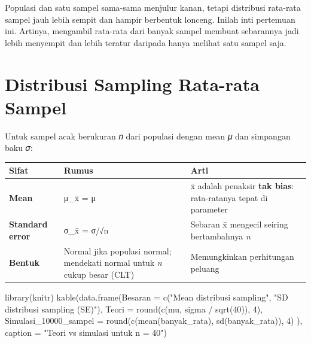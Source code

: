 \documentclass[
  indonesian,
  letterpaper,
]{book}
\newenvironment{Shaded}{\begin{snugshade}}{\end{snugshade}}
\newcommand{\AttributeTok}[1]{\textcolor[rgb]{0.40,0.45,0.13}{#1}}
\newcommand{\DecValTok}[1]{\textcolor[rgb]{0.68,0.00,0.00}{#1}}
\newcommand{\FunctionTok}[1]{\textcolor[rgb]{0.28,0.35,0.67}{#1}}
\newcommand{\NormalTok}[1]{\textcolor[rgb]{0.00,0.23,0.31}{#1}}
\newcommand{\SpecialCharTok}[1]{\textcolor[rgb]{0.37,0.37,0.37}{#1}}
\newcommand{\StringTok}[1]{\textcolor[rgb]{0.13,0.47,0.30}{#1}}
\newcounter{none} %
\begin{document}
Populasi dan satu sampel sama-sama menjulur kanan, tetapi distribusi
rata-rata sampel jauh lebih sempit dan hampir berbentuk lonceng. Inilah
inti pertemuan ini. Artinya, mengambil rata-rata dari banyak sampel
membuat sebarannya jadi lebih menyempit dan lebih teratur daripada hanya
melihat satu sampel saja.

\section{Distribusi Sampling Rata-rata
Sampel}\label{distribusi-sampling-rata-rata-sampel}

Untuk sampel acak berukuran 𝑛 dari populasi dengan mean 𝜇 dan simpangan
baku 𝜎:

{\def\LTcaptype{none} %
\begin{longtable}[]{@{}
  >{\raggedright\arraybackslash}p{}
  >{\raggedright\arraybackslash}p{}
  >{\raggedright\arraybackslash}p{}@{}}
\toprule\noalign{}
\begin{minipage}[b]{\linewidth}\raggedright
Sifat
\end{minipage} & \begin{minipage}[b]{\linewidth}\raggedright
Rumus
\end{minipage} & \begin{minipage}[b]{\linewidth}\raggedright
Arti
\end{minipage} \\
\midrule\noalign{}
\endhead
\bottomrule\noalign{}
\endlastfoot
\textbf{Mean} & μ\_x̄ = μ & x̄ adalah penaksir \textbf{tak bias}:
rata-ratanya tepat di parameter \\
\textbf{Standard error} & σ\_x̄ = σ/√n & Sebaran x̄ mengecil seiring
bertambahnya \emph{n} \\
\textbf{Bentuk} & Normal jika populasi normal; mendekati normal untuk
\emph{n} cukup besar (CLT) & Memungkinkan perhitungan peluang \\
\end{longtable}
}

\begin{Shaded}
\begin{Highlighting}[]
\FunctionTok{library}\NormalTok{(knitr)}
\FunctionTok{kable}\NormalTok{(}\FunctionTok{data.frame}\NormalTok{(}\AttributeTok{Besaran =} \FunctionTok{c}\NormalTok{(}\StringTok{"Mean distribusi sampling"}\NormalTok{, }\StringTok{"SD distribusi sampling (SE)"}\NormalTok{),}
\AttributeTok{Teori =} \FunctionTok{round}\NormalTok{(}\FunctionTok{c}\NormalTok{(mu, sigma }\SpecialCharTok{/} \FunctionTok{sqrt}\NormalTok{(}\DecValTok{40}\NormalTok{)), }\DecValTok{4}\NormalTok{),}
\AttributeTok{Simulasi\_10000\_sampel =} \FunctionTok{round}\NormalTok{(}\FunctionTok{c}\NormalTok{(}\FunctionTok{mean}\NormalTok{(banyak\_rata), }\FunctionTok{sd}\NormalTok{(banyak\_rata)), }\DecValTok{4}\NormalTok{)}
\NormalTok{), }\AttributeTok{caption =} \StringTok{"Teori vs simulasi untuk n = 40"}\NormalTok{)}
\end{Highlighting}
\end{Shaded}
\end{document}
